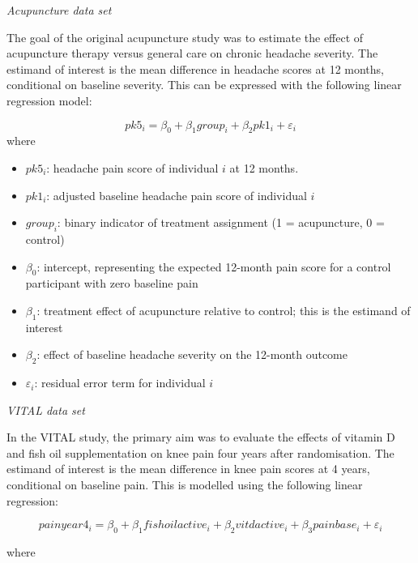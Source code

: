 \documentclass{article}
\providecommand{\tightlist}{%
  \setlength{\itemsep}{0pt}\setlength{\parskip}{0pt}}
\begin{document}
\emph{Acupuncture data set}

The goal of the original acupuncture study was to estimate the effect of
acupuncture therapy versus general care on chronic headache severity.
The estimand of interest is the mean difference in headache scores at 12
months, conditional on baseline severity. This can be expressed with the
following linear regression model:

\[pk5_i = \beta_0 + \beta_1 group_i + \beta_2 pk1_i + \varepsilon_i\]
where

\begin{itemize}
\tightlist
\item
  \(pk5_i\): headache pain score of individual \(i\) at 12 months.
\item
  \(pk1_i\): adjusted baseline headache pain score of individual \(i\)
\item
  \(group_i\): binary indicator of treatment assignment (1 =
  acupuncture, 0 = control)
\item
  \(\beta_0\): intercept, representing the expected 12-month pain score
  for a control participant with zero baseline pain
\item
  \(\beta_1\): treatment effect of acupuncture relative to control; this
  is the estimand of interest
\item
  \(\beta_2\): effect of baseline headache severity on the 12-month
  outcome
\item
  \(\varepsilon_i\): residual error term for individual \(i\)
\end{itemize}

\emph{VITAL data set}

In the VITAL study, the primary aim was to evaluate the effects of
vitamin D and fish oil supplementation on knee pain four years after
randomisation. The estimand of interest is the mean difference in knee
pain scores at 4 years, conditional on baseline pain. This is modelled
using the following linear regression:

\[painyear4_i = \beta_0 + \beta_1 fishoilactive_i + \beta_2 vitdactive_i + \beta_3 painbase_i + \varepsilon_i\]

where
\end{document}
